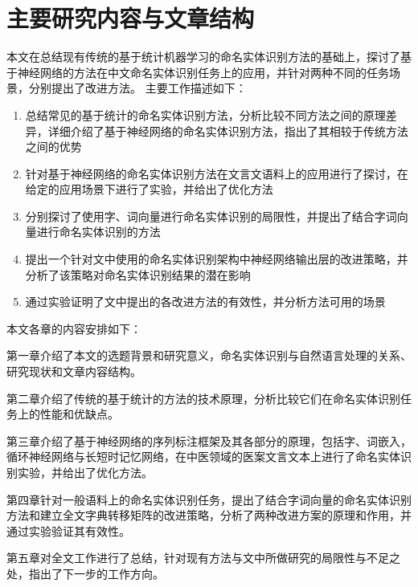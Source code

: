 \section{主要研究内容与文章结构}
本文在总结现有传统的基于统计机器学习的命名实体识别方法的基础上，探讨了基于神经网络的方法在中文命名实体识别任务上的应用，并针对两种不同的任务场景，分别提出了改进方法。
主要工作描述如下：
\begin{enumerate}
    \item 总结常见的基于统计的命名实体识别方法，分析比较不同方法之间的原理差异，详细介绍了基于神经网络的命名实体识别方法，指出了其相较于传统方法之间的优势
    \item 针对基于神经网络的命名实体识别方法在文言文语料上的应用进行了探讨，在给定的应用场景下进行了实验，并给出了优化方法
    \item 分别探讨了使用字、词向量进行命名实体识别的局限性，并提出了结合字词向量进行命名实体识别的方法
    \item 提出一个针对文中使用的命名实体识别架构中神经网络输出层的改进策略，并分析了该策略对命名实体识别结果的潜在影响
    \item 通过实验证明了文中提出的各改进方法的有效性，并分析方法可用的场景
\end{enumerate}
本文各章的内容安排如下：

第一章介绍了本文的选题背景和研究意义，命名实体识别与自然语言处理的关系、研究现状和文章内容结构。

第二章介绍了传统的基于统计的方法的技术原理，分析比较它们在命名实体识别任务上的性能和优缺点。

第三章介绍了基于神经网络的序列标注框架及其各部分的原理，包括字、词嵌入，循环神经网络与长短时记忆网络，在中医领域的医案文言文本上进行了命名实体识别实验，并给出了优化方法。

第四章针对一般语料上的命名实体识别任务，提出了结合字词向量的命名实体识别方法和建立全文字典转移矩阵的改进策略，分析了两种改进方案的原理和作用，并通过实验验证其有效性。

第五章对全文工作进行了总结，针对现有方法与文中所做研究的局限性与不足之处，指出了下一步的工作方向。
